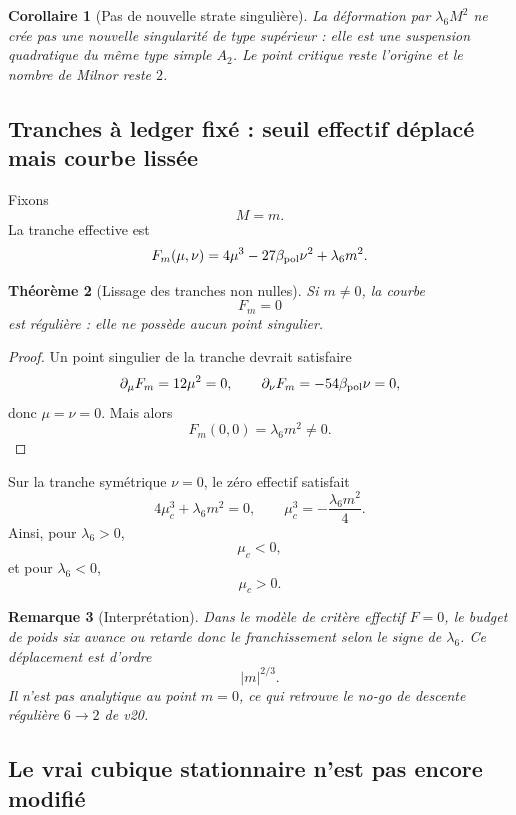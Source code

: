 \documentclass[11pt,a4paper]{article}
\newtheorem{theorem}{Théorème}[section]
\newtheorem{corollary}[theorem]{Corollaire}
\newtheorem{remark}[theorem]{Remarque}
\begin{document}
\begin{corollary}[Pas de nouvelle strate singulière]\label{cor:v21-A2-suspension}
La déformation par $\lambda_6M^2$ ne crée pas une nouvelle singularité de type supérieur : elle est une \emph{suspension quadratique} du même type simple $A_2$. Le point critique reste l'origine et le nombre de Milnor reste $2$.
\end{corollary}

\subsection{Tranches à ledger fixé : seuil effectif déplacé mais courbe lissée}

Fixons
\[
 M=m.
\]
La tranche effective est
\[
 F_m(\mu,\nu)
 =
 4\mu^3-27\beta_{\rm pol}\nu^2+\lambda_6m^2.
\]

\begin{theorem}[Lissage des tranches non nulles]\label{thm:v21-fixed-M-smooth}
Si $m\neq0$, la courbe
\[
 F_m=0
\]
est régulière : elle ne possède aucun point singulier.
\end{theorem}

\begin{proof}
Un point singulier de la tranche devrait satisfaire
\[
 \partial_\mu F_m=12\mu^2=0,
 \qquad
 \partial_\nu F_m=-54\beta_{\rm pol}\nu=0,
\]
donc $\mu=\nu=0$. Mais alors
\[
 F_m(0,0)=\lambda_6m^2\neq0.
\]
\end{proof}

Sur la tranche symétrique $\nu=0$, le zéro effectif satisfait
\begin{equation}\label{eq:v21-muc}
 \boxed{
 4\mu_c^3+\lambda_6m^2=0,
 \qquad
 \mu_c^3=-\frac{\lambda_6m^2}{4}.}
\end{equation}
Ainsi, pour $\lambda_6>0$,
\[
 \mu_c<0,
\]
et pour $\lambda_6<0$,
\[
 \mu_c>0.
\]

\begin{remark}[Interprétation]
Dans le modèle de \emph{critère effectif} $F=0$, le budget de poids six avance ou retarde donc le franchissement selon le signe de $\lambda_6$. Ce déplacement est d'ordre
\[
 |m|^{2/3}.
\]
Il n'est pas analytique au point $m=0$, ce qui retrouve le no-go de descente régulière $6\to2$ de v20.
\end{remark}

\subsection{Le vrai cubique stationnaire n'est pas encore modifié}
\end{document}
